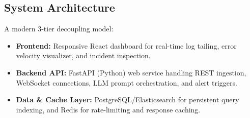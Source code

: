 \documentclass[11pt,a4paper]{article}
\begin{document}

\subsection{System Architecture}

A modern 3-tier decoupling model:

\begin{itemize}[leftmargin=0.7cm]

\item \textbf{Frontend:} Responsive React dashboard for real-time log tailing, error velocity visualizer, and incident inspection.

\item \textbf{Backend API:} FastAPI (Python) web service handling REST ingestion, WebSocket connections, LLM prompt orchestration, and alert triggers.

\item \textbf{Data \& Cache Layer:} PostgreSQL/Elasticsearch for persistent query indexing, and Redis for rate-limiting and response caching.

\end{itemize}

\end{document}

